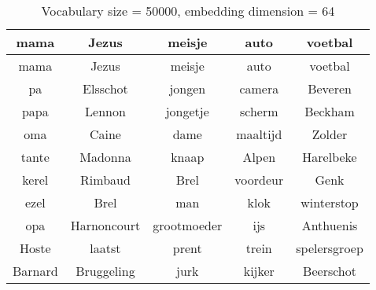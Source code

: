 \begin{table}[H]
\centering
\caption[Vocabulary size = 50000, embedding dimension = 64]{Vocabulary size = 50000, embedding dimension = 64}
\label{tab:emb_experiments}
\begin{tabular}{|c|c|c|c|c|}
\hline
mama & Jezus & meisje & auto & voetbal \\ \hline \hline
mama & Jezus & meisje & auto & voetbal\\
pa & Elsschot & jongen & camera & Beveren\\
papa & Lennon & jongetje & scherm & Beckham\\
oma & Caine & dame & maaltijd & Zolder\\
tante & Madonna & knaap & Alpen & Harelbeke\\
kerel & Rimbaud & Brel & voordeur & Genk\\
ezel & Brel & man & klok & winterstop\\
opa & Harnoncourt & grootmoeder & ijs & Anthuenis\\
Hoste & laatst & prent & trein & spelersgroep\\
Barnard & Bruggeling & jurk & kijker & Beerschot\\
\hline
\end{tabular}
\end{table}
